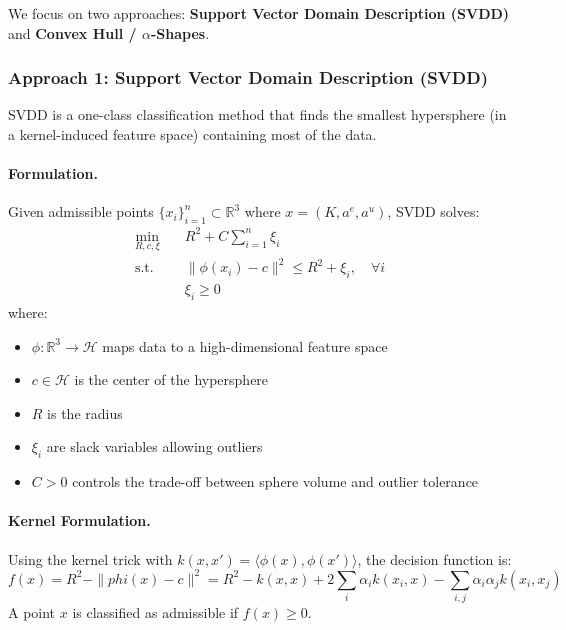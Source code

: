 We focus on two approaches: \textbf{Support Vector Domain Description (SVDD)} and \textbf{Convex Hull / $\alpha$-Shapes}.


\subsubsection{Approach 1: Support Vector Domain Description (SVDD)}

SVDD is a one-class classification method that finds the smallest hypersphere (in a kernel-induced feature space) containing most of the data.

\paragraph{Formulation.}
Given admissible points $\{x_i\}_{i=1}^n \subset \mathbb{R}^3$ where $x = (K, a^e, a^u)$, SVDD solves:
\begin{equation}
\begin{aligned}
    \min_{R, c, \xi} \quad & R^2 + C \sum_{i=1}^n \xi_i \\
    \text{s.t.} \quad & \|\phi(x_i) - c\|^2 \leq R^2 + \xi_i, \quad \forall i \\
    & \xi_i \geq 0
\end{aligned}
\end{equation}
where:
\begin{itemize}
    \item $\phi: \mathbb{R}^3 \to \mathcal{H}$ maps data to a high-dimensional feature space
    \item $c \in \mathcal{H}$ is the center of the hypersphere
    \item $R$ is the radius
    \item $\xi_i$ are slack variables allowing outliers
    \item $C > 0$ controls the trade-off between sphere volume and outlier tolerance
\end{itemize}

\paragraph{Kernel Formulation.}
Using the kernel trick with $k(x, x') = \langle \phi(x), \phi(x') \rangle$, the decision function is:
\begin{equation}
    f(x) = R^2 - \|phi(x) - c\|^2 = R^2 - k(x,x) + 2\sum_i \alpha_i k(x_i, x) - \sum_{i,j} \alpha_i \alpha_j k(x_i, x_j)
\end{equation}
A point $x$ is classified as admissible if $f(x) \geq 0$.

